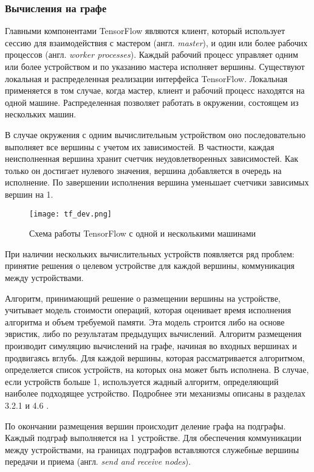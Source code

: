 \subsubsection{Вычисления на графе}

Главными компонентами TensorFlow являются клиент, который использует сессию
для взаимодействия с мастером (англ. \textit{master}), и один или более
рабочих процессов (англ. \textit{worker processes}). Каждый рабочий процесс
управляет одним или более устройством и по указанию мастера исполняет вершины.
Существуют локальная и распределенная реализации интерфейса TensorFlow.
Локальная применяется в том случае, когда мастер, клиент и рабочий процесс
находятся на одной машине. Распределенная позволяет работать в окружении,
состоящем из нескольких машин.

В случае окружения с одним вычислительным устройством оно последовательно
выполняет все вершины с учетом их зависимостей. В частности, каждая
неисполненная вершина хранит счетчик неудовлетворенных зависимостей. Как только
он достигает нулевого значения, вершина добавляется в очередь на исполнение.
По завершении исполнения вершина уменьшает счетчики зависимых вершин на 1.

\begin{figure}[h]
    \centering
    \texttt{[image: tf\_dev.png]}
    \caption{Схема работы TensorFlow с одной и несколькими машинами}
    \label{fig:tf_dev}
\end{figure}

При наличии нескольких вычислительных устройств появляется ряд проблем: принятие
решения о целевом устройстве для каждой вершины, коммуникация между устройствами.

Алгоритм, принимающий решение о размещении вершины на устройстве, учитывает
модель стоимости операций, которая оценивает время исполнения алгоритма и
объем требуемой памяти. Эта модель строится либо на основе эвристик, либо
по результатам предыдущих вычислений. Алгоритм размещения производит симуляцию
вычислений на графе, начиная во входных вершинах и продвигаясь вглубь. Для
каждой вершины, которая рассматривается алгоритмом, определяется список устройств,
на которых она может быть исполнена. В случае, если устройств больше 1,
используется жадный алгоритм, определяющий наиболее подходящее устройство.
Подробнее эти механизмы описаны в разделах 3.2.1 и 4.6 \cite{tf}.

По окончании размещения вершин происходит деление графа на подграфы. Каждый
подграф выполняется на 1 устройстве. Для обеспечения коммуникации между
устройствами, на границах подграфов вставляются служебные вершины передачи и
приема (англ. \textit{send and receive nodes}).

